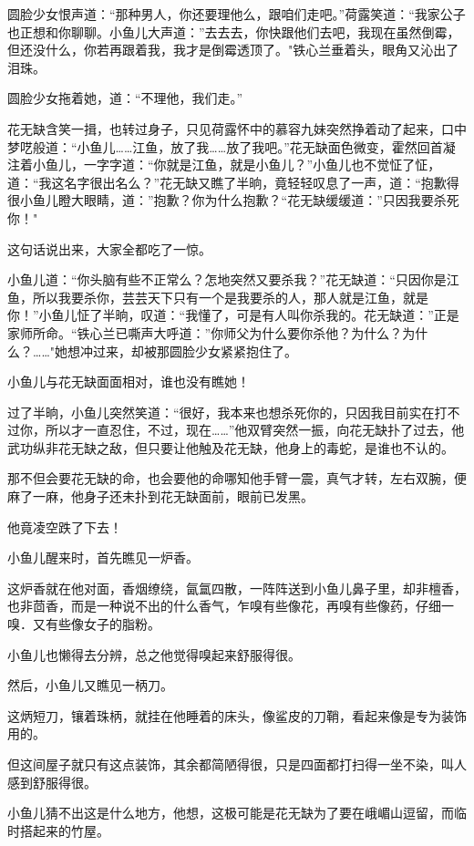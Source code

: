 \documentclass[12pt,oneside]{book}
\begin{document}
圆脸少女恨声道：``那种男人，你还要理他么，跟咱们走吧。''荷露笑道：``我家公子也正想和你聊聊。小鱼儿大声道：''去去去，你快跟他们去吧，我现在虽然倒霉，但还没什么，你若再跟着我，我才是倒霉透顶了。"铁心兰垂着头，眼角又沁出了泪珠。

圆脸少女拖着她，道：``不理他，我们走。''

花无缺含笑一揖，也转过身子，只见荷露怀中的慕容九妹突然挣着动了起来，口中梦呓般道：``小鱼儿\ldots\ldots 江鱼，放了我\ldots\ldots 放了我吧。''花无缺面色微变，霍然回首凝注着小鱼儿，一字字道：``你就是江鱼，就是小鱼儿？''小鱼儿也不觉怔了怔，道：``我这名字很出名么？''花无缺又瞧了半晌，竟轻轻叹息了一声，道：``抱歉得很小鱼儿瞪大眼睛，道：''抱歉？你为什么抱歉？``花无缺缓缓道：''只因我要杀死你！"

这句话说出来，大家全都吃了一惊。

小鱼儿道：``你头脑有些不正常么？怎地突然又要杀我？''花无缺道：``只因你是江鱼，所以我要杀你，芸芸天下只有一个是我要杀的人，那人就是江鱼，就是你！''小鱼儿怔了半晌，叹道：``我懂了，可是有人叫你杀我的。花无缺道：''正是家师所命。``铁心兰已嘶声大呼道：''你师父为什么要你杀他？为什么？为什么？\ldots\ldots"她想冲过来，却被那圆脸少女紧紧抱住了。

小鱼儿与花无缺面面相对，谁也没有瞧她！

过了半晌，小鱼儿突然笑道：``很好，我本来也想杀死你的，只因我目前实在打不过你，所以才一直忍住，不过，现在\ldots\ldots{}''他双臂突然一振，向花无缺扑了过去，他武功纵非花无缺之敌，但只要让他触及花无缺，他身上的毒蛇，是谁也不认的。

那不但会要花无缺的命，也会要他的命哪知他手臂一震，真气才转，左右双腕，便麻了一麻，他身子还未扑到花无缺面前，眼前已发黑。

他竟凌空跌了下去！

小鱼儿醒来时，首先瞧见一炉香。

这炉香就在他对面，香烟缭绕，氤氲四散，一阵阵送到小鱼儿鼻子里，却非檀香，也非茴香，而是一种说不出的什么香气，乍嗅有些像花，再嗅有些像药，仔细一嗅．又有些像女子的脂粉。

小鱼儿也懒得去分辨，总之他觉得嗅起来舒服得很。

然后，小鱼儿又瞧见一柄刀。

这炳短刀，镶着珠柄，就挂在他睡着的床头，像鲨皮的刀鞘，看起来像是专为装饰用的。

但这间屋子就只有这点装饰，其余都简陋得很，只是四面都打扫得一坐不染，叫人感到舒服得很。

小鱼儿猜不出这是什么地方，他想，这极可能是花无缺为了要在峨嵋山逗留，而临时搭起来的竹屋。
\end{document}
